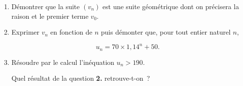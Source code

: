 \begin{enumerate}
     \begin{enumerate}[label=\alph*.]
          \item Démontrer que la suite $(v_n)$ est une suite géométrique dont on précisera la raison et le premier terme $v_0$.
          \item Exprimer $v_n$ en fonction de $n$ puis démonter que, pour tout entier naturel $n$,
          \par
          \[u_n=70\times 1,14^n+50.\]
          \par
          \item Résoudre par le calcul l'inéquation $u_n>190$.
          \par
          Quel résultat de la question \textbf{2.} retrouve-t-on~?
     \end{enumerate}
\end{enumerate}
